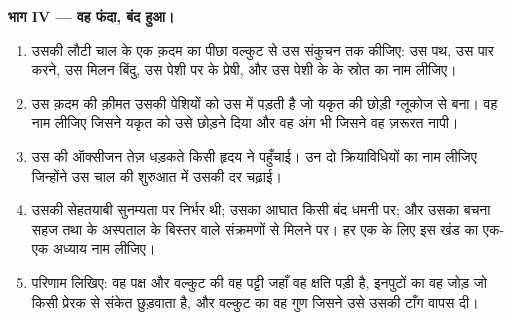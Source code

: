 \begin{problem}
\medskip
\noindent\textbf{भाग IV --- वह फंदा, बंद हुआ।}
\begin{enumerate}[resume]
  \item उसकी लौटी चाल के एक क़दम का पीछा वल्कुट से उस संकुचन तक कीजिए: उस
        पथ, उस पार करने, उस मिलन बिंदु, उस पेशी पर के प्रेषी, और उस पेशी के
         के स्रोत का नाम लीजिए।
  \item उस क़दम की क़ीमत उसकी पेशियों को उस  में पड़ती है जो यकृत की
        छोड़ी ग्लूकोज से बना। वह  नाम लीजिए जिसने यकृत को उसे छोड़ने
        दिया और वह अंग भी जिसने वह ज़रूरत नापी।
  \item उस  की ऑक्सीजन तेज़ धड़कते किसी हृदय ने पहुँचाई। उन दो
        क्रियाविधियों का नाम लीजिए जिन्होंने उस चाल की शुरुआत में उसकी दर
        चढ़ाई।
  \item उसकी सेहतयाबी सुनम्यता पर निर्भर थी; उसका आघात किसी बंद धमनी पर; और
        उसका बचना सहज तथा  के अस्पताल के बिस्तर वाले
        संक्रमणों से मिलने पर। हर एक के लिए इस खंड का एक-एक अध्याय नाम
        लीजिए।
  \item परिणाम लिखिए: वह पक्ष और वल्कुट की वह पट्टी जहाँ वह क्षति पड़ी है,
        इनपुटों का वह जोड़ जो किसी प्रेरक  से संकेत छुड़वाता है, और
        वल्कुट का वह गुण जिसने उसे उसकी टाँग वापस दी।
\end{enumerate}
\end{problem}
